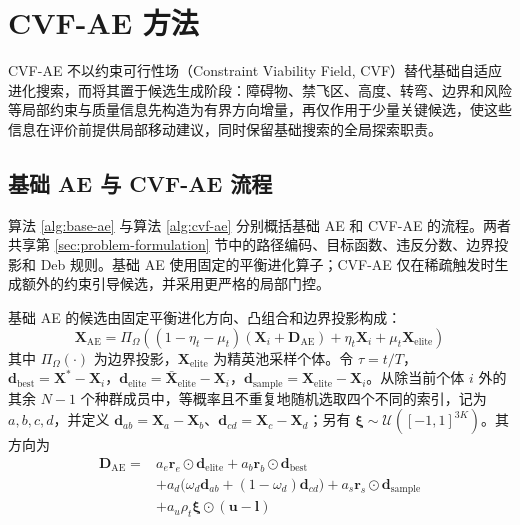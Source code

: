 ﻿\section{CVF-AE 方法}
\label{sec:method}

CVF-AE 不以约束可行性场（Constraint Viability Field, CVF）替代基础自适应进化搜索，而将其置于候选生成阶段：障碍物、禁飞区、高度、转弯、边界和风险等局部约束与质量信息先构造为有界方向增量，再仅作用于少量关键候选，使这些信息在评价前提供局部移动建议，同时保留基础搜索的全局探索职责。

\subsection{基础 AE 与 CVF-AE 流程}

算法 \ref{alg:base-ae} 与算法 \ref{alg:cvf-ae} 分别概括基础 AE 和 CVF-AE 的流程。两者共享第 \ref{sec:problem-formulation} 节中的路径编码、目标函数、违反分数、边界投影和 Deb 规则。基础 AE 使用固定的平衡进化算子；CVF-AE 仅在稀疏触发时生成额外的约束引导候选，并采用更严格的局部门控。

基础 AE 的候选由固定平衡进化方向、凸组合和边界投影构成：
\begin{equation}
    \mathbf{X}_{\mathrm{AE}} =
    \Pi_{\Omega}
    \left(
    (1-\eta_t-\mu_t)(\mathbf{X}_i+\mathbf{D}_{\mathrm{AE}})
    +\eta_t\mathbf{X}_i+\mu_t\mathbf{X}_{\mathrm{elite}}
    \right)
    \label{eq:ae-candidate}
\end{equation}
其中 $\Pi_{\Omega}(\cdot)$ 为边界投影，$\mathbf{X}_{\mathrm{elite}}$ 为精英池采样个体。令 $\tau=t/T$，$\mathbf d_{\mathrm{best}}=\mathbf X^*-\mathbf X_i$，$\mathbf d_{\mathrm{elite}}=\bar{\mathbf X}_{\mathrm{elite}}-\mathbf X_i$，$\mathbf d_{\mathrm{sample}}=\mathbf X_{\mathrm{elite}}-\mathbf X_i$。从除当前个体 $i$ 外的其余 $N-1$ 个种群成员中，等概率且不重复地随机选取四个不同的索引，记为 $a,b,c,d$，并定义 $\mathbf d_{ab}=\mathbf X_a-\mathbf X_b$、$\mathbf d_{cd}=\mathbf X_c-\mathbf X_d$；另有 $\boldsymbol\xi\sim\mathcal U([-1,1]^{3K})$。其方向为
\begin{equation}
    \begin{aligned}
    \mathbf D_{\mathrm{AE}}
    ={}&a_e\mathbf r_e\odot\mathbf d_{\mathrm{elite}}
    +a_b\mathbf r_b\odot\mathbf d_{\mathrm{best}}\\
    &+a_d\bigl(\omega_d\mathbf d_{ab}+(1-\omega_d)\mathbf d_{cd}\bigr)
    +a_s\mathbf r_s\odot\mathbf d_{\mathrm{sample}}\\
    &+a_u\rho_t\boldsymbol\xi\odot(\mathbf u-\mathbf l)
    \end{aligned}
\label{eq:ae-base-direction}
\end{equation}

